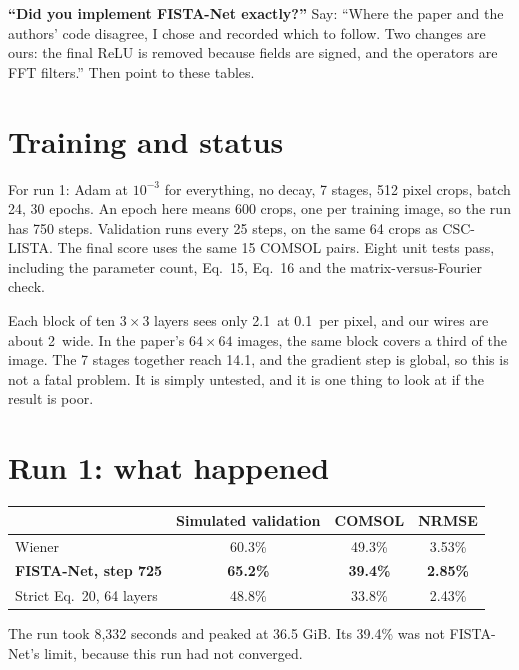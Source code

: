 \begin{defend}
\textbf{``Did you implement FISTA-Net exactly?''} Say: ``Where the paper and the authors' code disagree, I chose and
recorded which to follow. Two changes are ours: the final ReLU is removed because fields are signed, and the operators
are FFT filters.'' Then point to these tables.
\end{defend}

\section{Training and status}

For run 1: Adam at $10^{-3}$ for everything, no decay, 7 stages, 512 pixel crops, batch 24, 30 epochs. An epoch here means 600 crops,
one per training image, so the run has 750 steps. Validation runs every 25 steps, on the same 64 crops as CSC-LISTA. The
final score uses the same 15 COMSOL pairs. Eight unit tests pass, including the parameter count, Eq.~15, Eq.~16 and the
matrix-versus-Fourier check.

\begin{careful}
Each block of ten $3\times3$ layers sees only 2.1\um\ at 0.1\um\ per pixel, and our wires are about 2\um\ wide. In the paper's
$64\times64$ images, the same block covers a third of the image. The 7 stages together reach 14.1\um, and the gradient
step is global, so this is not a fatal problem. It is simply untested, and it is one thing to look at if the result is poor.
\end{careful}

\section{Run 1: what happened}

\begin{center}
\begin{tabular}{lccc}
\toprule
 & Simulated validation & COMSOL & NRMSE \\
\midrule
Wiener & 60.3\% & 49.3\% & 3.53\% \\
\textbf{FISTA-Net, step 725} & \textbf{65.2\%} & \textbf{39.4\%} & \textbf{2.85\%} \\
Strict Eq.~20, 64 layers & 48.8\% & 33.8\% & 2.43\% \\
\bottomrule
\end{tabular}
\end{center}

The run took 8,332 seconds and peaked at 36.5 GiB. Its 39.4\% was not FISTA-Net's limit, because this run had not
converged.

